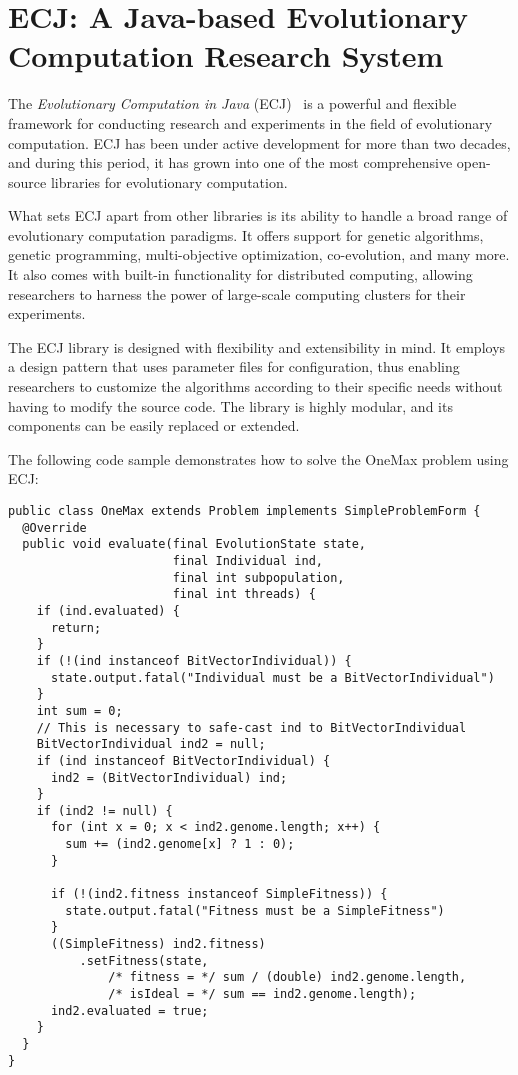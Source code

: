 \section{ECJ: A Java-based Evolutionary Computation Research System}
\label{sec:sota:ecj}

The \emph{Evolutionary Computation in Java} (ECJ)~\autocite{ECJ} is a powerful and flexible framework for conducting research and experiments in the field of evolutionary computation. ECJ has been under active development for more than two decades, and during this period, it has grown into one of the most comprehensive open-source libraries for evolutionary computation.

What sets ECJ apart from other libraries is its ability to handle a broad range of evolutionary computation paradigms. It offers support for genetic algorithms, genetic programming, multi-objective optimization, co-evolution, and many more. It also comes with built-in functionality for distributed computing, allowing researchers to harness the power of large-scale computing clusters for their experiments.

The ECJ library is designed with flexibility and extensibility in mind. It employs a design pattern that uses parameter files for configuration, thus enabling researchers to customize the algorithms according to their specific needs without having to modify the source code. The library is highly modular, and its components can be easily replaced or extended.

The following code sample demonstrates how to solve the OneMax problem using ECJ:

\begin{verbatim}
public class OneMax extends Problem implements SimpleProblemForm {
  @Override
  public void evaluate(final EvolutionState state,
                       final Individual ind,
                       final int subpopulation,
                       final int threads) {
    if (ind.evaluated) {
      return;
    }
    if (!(ind instanceof BitVectorIndividual)) {
      state.output.fatal("Individual must be a BitVectorIndividual")
    }
    int sum = 0;
    // This is necessary to safe-cast ind to BitVectorIndividual
    BitVectorIndividual ind2 = null;
    if (ind instanceof BitVectorIndividual) {
      ind2 = (BitVectorIndividual) ind;
    }
    if (ind2 != null) {
      for (int x = 0; x < ind2.genome.length; x++) {
        sum += (ind2.genome[x] ? 1 : 0);
      }

      if (!(ind2.fitness instanceof SimpleFitness)) {
        state.output.fatal("Fitness must be a SimpleFitness")
      }
      ((SimpleFitness) ind2.fitness)
          .setFitness(state,
              /* fitness = */ sum / (double) ind2.genome.length,
              /* isIdeal = */ sum == ind2.genome.length);
      ind2.evaluated = true;
    }
  }
}
\end{verbatim}

